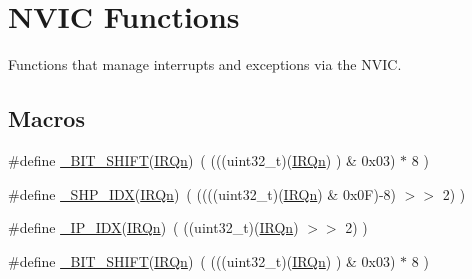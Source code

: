 \hypertarget{group___c_m_s_i_s___core___n_v_i_c_functions}{}\section{N\+V\+IC Functions}
\label{group___c_m_s_i_s___core___n_v_i_c_functions}


Functions that manage interrupts and exceptions via the N\+V\+IC.  


\subsection*{Macros}
\begin{DoxyCompactItemize}
\item 
\#define \mbox{\hyperlink{group___c_m_s_i_s___core___n_v_i_c_functions_ga53c75b28823441c6153269f0ecbed878}{\+\_\+\+B\+I\+T\+\_\+\+S\+H\+I\+FT}}(\mbox{\hyperlink{group___configuration__section__for___c_m_s_i_s_ga666eb0caeb12ec0e281415592ae89083}{I\+R\+Qn}})~(  (((uint32\+\_\+t)(\mbox{\hyperlink{group___configuration__section__for___c_m_s_i_s_ga666eb0caeb12ec0e281415592ae89083}{I\+R\+Qn}})       )    \&  0x03) $\ast$ 8 )
\item 
\#define \mbox{\hyperlink{group___c_m_s_i_s___core___n_v_i_c_functions_gaee4f7eb5d7e770ad51489dbceabb1755}{\+\_\+\+S\+H\+P\+\_\+\+I\+DX}}(\mbox{\hyperlink{group___configuration__section__for___c_m_s_i_s_ga666eb0caeb12ec0e281415592ae89083}{I\+R\+Qn}})~( ((((uint32\+\_\+t)(\mbox{\hyperlink{group___configuration__section__for___c_m_s_i_s_ga666eb0caeb12ec0e281415592ae89083}{I\+R\+Qn}}) \& 0x0\+F)-\/8) $>$$>$    2)     )
\item 
\#define \mbox{\hyperlink{group___c_m_s_i_s___core___n_v_i_c_functions_ga370ec4b1751a6a889d849747df3763a9}{\+\_\+\+I\+P\+\_\+\+I\+DX}}(\mbox{\hyperlink{group___configuration__section__for___c_m_s_i_s_ga666eb0caeb12ec0e281415592ae89083}{I\+R\+Qn}})~(   ((uint32\+\_\+t)(\mbox{\hyperlink{group___configuration__section__for___c_m_s_i_s_ga666eb0caeb12ec0e281415592ae89083}{I\+R\+Qn}})            $>$$>$    2)     )
\item 
\#define \mbox{\hyperlink{group___c_m_s_i_s___core___n_v_i_c_functions_ga53c75b28823441c6153269f0ecbed878}{\+\_\+\+B\+I\+T\+\_\+\+S\+H\+I\+FT}}(\mbox{\hyperlink{group___configuration__section__for___c_m_s_i_s_ga666eb0caeb12ec0e281415592ae89083}{I\+R\+Qn}})~(  (((uint32\+\_\+t)(\mbox{\hyperlink{group___configuration__section__for___c_m_s_i_s_ga666eb0caeb12ec0e281415592ae89083}{I\+R\+Qn}})       )    \&  0x03) $\ast$ 8 )

\end{DoxyCompactItemize}
